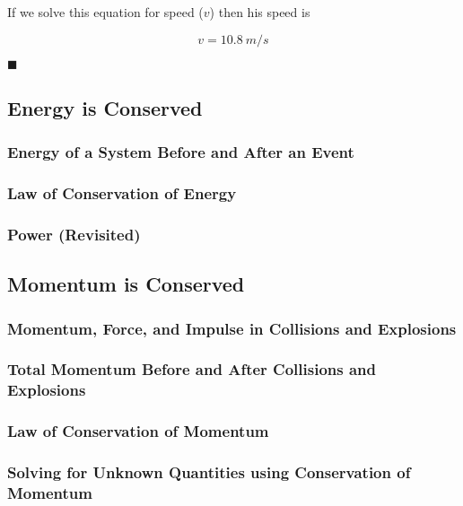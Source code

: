\documentclass[dvipsnames]{article}
\begin{document}
If we solve this equation for speed ($v$) then his speed is

\begin{equation*}
    v = \SI{10.8}{m/s}
\end{equation*}

\hfill $\blacksquare$

\subsection{Energy is Conserved}

\subsubsection{Energy of a System Before and After an Event}

\subsubsection{Law of Conservation of Energy}

\subsubsection{Power (Revisited)}


\subsection{Momentum is Conserved}

\subsubsection{Momentum, Force, and Impulse in Collisions and Explosions}

\subsubsection{Total Momentum Before and After Collisions and Explosions}

\subsubsection{Law of Conservation of Momentum}

\subsubsection{Solving for Unknown Quantities using Conservation of Momentum}
\end{document}
